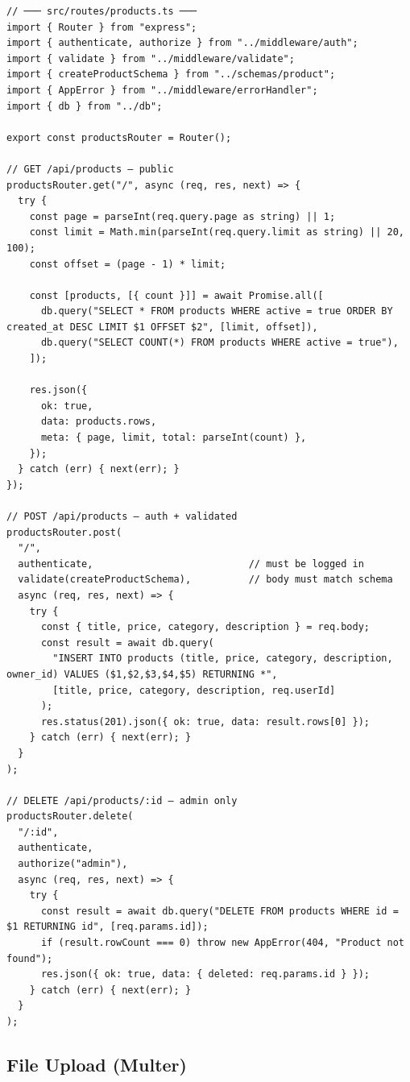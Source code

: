 \documentclass[10pt, a4paper]{article}
\begin{document}
\begin{lstlisting}[language=myjs]
// ─── src/routes/products.ts ───
import { Router } from "express";
import { authenticate, authorize } from "../middleware/auth";
import { validate } from "../middleware/validate";
import { createProductSchema } from "../schemas/product";
import { AppError } from "../middleware/errorHandler";
import { db } from "../db";

export const productsRouter = Router();

// GET /api/products — public
productsRouter.get("/", async (req, res, next) => {
  try {
    const page = parseInt(req.query.page as string) || 1;
    const limit = Math.min(parseInt(req.query.limit as string) || 20, 100);
    const offset = (page - 1) * limit;

    const [products, [{ count }]] = await Promise.all([
      db.query("SELECT * FROM products WHERE active = true ORDER BY created_at DESC LIMIT $1 OFFSET $2", [limit, offset]),
      db.query("SELECT COUNT(*) FROM products WHERE active = true"),
    ]);

    res.json({
      ok: true,
      data: products.rows,
      meta: { page, limit, total: parseInt(count) },
    });
  } catch (err) { next(err); }
});

// POST /api/products — auth + validated
productsRouter.post(
  "/",
  authenticate,                           // must be logged in
  validate(createProductSchema),          // body must match schema
  async (req, res, next) => {
    try {
      const { title, price, category, description } = req.body;
      const result = await db.query(
        "INSERT INTO products (title, price, category, description, owner_id) VALUES ($1,$2,$3,$4,$5) RETURNING *",
        [title, price, category, description, req.userId]
      );
      res.status(201).json({ ok: true, data: result.rows[0] });
    } catch (err) { next(err); }
  }
);

// DELETE /api/products/:id — admin only
productsRouter.delete(
  "/:id",
  authenticate,
  authorize("admin"),
  async (req, res, next) => {
    try {
      const result = await db.query("DELETE FROM products WHERE id = $1 RETURNING id", [req.params.id]);
      if (result.rowCount === 0) throw new AppError(404, "Product not found");
      res.json({ ok: true, data: { deleted: req.params.id } });
    } catch (err) { next(err); }
  }
);
\end{lstlisting}


\subsection{File Upload (Multer)}
\end{document}
